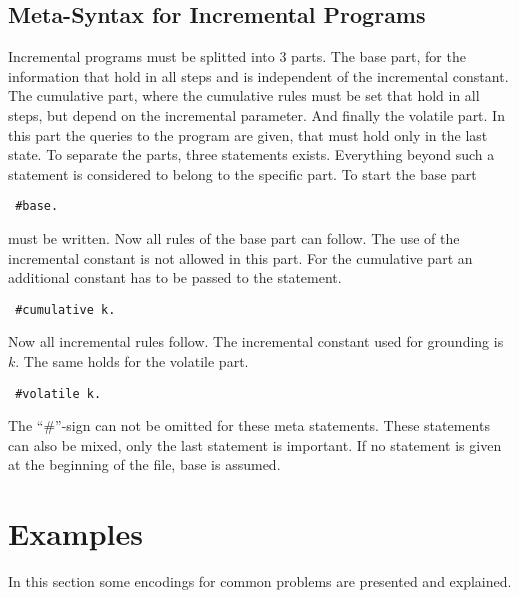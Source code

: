 \documentclass[a4paper,10pt]{article}
\begin{document}
\subsection{Meta-Syntax for Incremental Programs}
\label{metasyntaxinc}
Incremental programs must be splitted into 3 parts.
The base part, for the information that hold in all steps and is independent of the incremental constant.
The cumulative part, where the cumulative rules must be set that hold in all steps, but depend on the incremental parameter.
And finally the volatile part. In this part the queries to the program are given, that must hold only in the last state.
To separate the parts, three statements exists. Everything beyond such a statement is considered to belong to the specific part.
To start the base part
\begin{verbatim}
 #base.
\end{verbatim}
must be written. Now all rules of the base part can follow.
The use of the incremental constant is not allowed in this part.
For the cumulative part an additional constant has to be passed to the statement.
\begin{verbatim}
 #cumulative k.
\end{verbatim}
Now all incremental rules follow. The incremental constant used for grounding is $k$.
The same holds for the volatile part.
\begin{verbatim}
 #volatile k.
\end{verbatim}
The ``\#''-sign can not be omitted for these meta statements.
These statements can also be mixed, only the last statement is important.
If no statement is given at the beginning of the file, base is assumed.


\section{Examples}
In this section some encodings for common problems are presented and explained.
\end{document}

